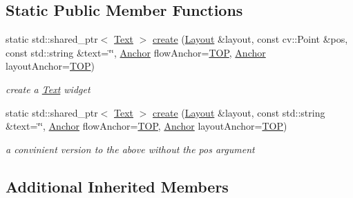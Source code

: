 \subsection*{Static Public Member Functions}
\begin{DoxyCompactItemize}
\item 
static std\+::shared\+\_\+ptr$<$ \hyperlink{classcanvascv_1_1Text}{Text} $>$ \hyperlink{classcanvascv_1_1Text_a7f3552263b6f185f78d90549e7ac38f7}{create} (\hyperlink{classcanvascv_1_1Layout}{Layout} \&layout, const cv\+::\+Point \&pos, const std\+::string \&text=\char`\"{}\char`\"{}, \hyperlink{classcanvascv_1_1Widget_a98ca3c300ba50b316fa5a1d300456abe}{Anchor} flow\+Anchor=\hyperlink{classcanvascv_1_1Widget_a98ca3c300ba50b316fa5a1d300456abeaa6a2c9d829ceed729afe8cb2f51b2f0c}{T\+OP}, \hyperlink{classcanvascv_1_1Widget_a98ca3c300ba50b316fa5a1d300456abe}{Anchor} layout\+Anchor=\hyperlink{classcanvascv_1_1Widget_a98ca3c300ba50b316fa5a1d300456abeaa6a2c9d829ceed729afe8cb2f51b2f0c}{T\+OP})
\begin{DoxyCompactList}\small\item\em create a \hyperlink{classcanvascv_1_1Text}{Text} widget \end{DoxyCompactList}\item 
static std\+::shared\+\_\+ptr$<$ \hyperlink{classcanvascv_1_1Text}{Text} $>$ \hyperlink{classcanvascv_1_1Text_ae95c6c8ba42111f81ce8120e9fe54fd6}{create} (\hyperlink{classcanvascv_1_1Layout}{Layout} \&layout, const std\+::string \&text=\char`\"{}\char`\"{}, \hyperlink{classcanvascv_1_1Widget_a98ca3c300ba50b316fa5a1d300456abe}{Anchor} flow\+Anchor=\hyperlink{classcanvascv_1_1Widget_a98ca3c300ba50b316fa5a1d300456abeaa6a2c9d829ceed729afe8cb2f51b2f0c}{T\+OP}, \hyperlink{classcanvascv_1_1Widget_a98ca3c300ba50b316fa5a1d300456abe}{Anchor} layout\+Anchor=\hyperlink{classcanvascv_1_1Widget_a98ca3c300ba50b316fa5a1d300456abeaa6a2c9d829ceed729afe8cb2f51b2f0c}{T\+OP})\hypertarget{classcanvascv_1_1Text_ae95c6c8ba42111f81ce8120e9fe54fd6}{}\label{classcanvascv_1_1Text_ae95c6c8ba42111f81ce8120e9fe54fd6}

\begin{DoxyCompactList}\small\item\em a convinient version to the above without the \textquotesingle{}pos\textquotesingle{} argument \end{DoxyCompactList}\end{DoxyCompactItemize}
\subsection*{Additional Inherited Members}


